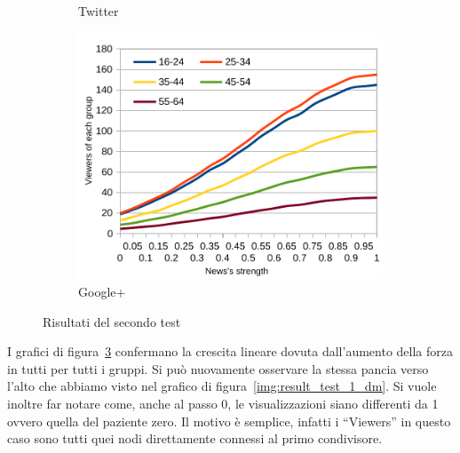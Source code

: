 \begin{figure}[!ht]
\begin{subfigure}[c]{0.32\textwidth}
\begin{center}
    \end{center}
    \vspace*{-10pt}
    \caption{Twitter}
    \label{img:result_test_2_tw_2}
  \end{subfigure}  
  \begin{subfigure}[r]{0.32\textwidth}
    \begin{center}
      \includegraphics[width=1\textwidth]{charts/second-test-gp_2.pdf}
    \end{center}
    \vspace*{-10pt}
    \caption{Google+}
    \label{img:result_test_2_gp_2}
  \end{subfigure}  
 \caption{Risultati del secondo test}
 \label{img:results_test_2_2}
\end{figure}
\vspace*{-15pt}


I grafici di figura~\ref{img:results_test_2_2} confermano la crescita lineare dovuta dall'aumento della forza in tutti per tutti i gruppi.
Si può nuovamente osservare la stessa pancia verso l'alto che abbiamo visto nel grafico di figura~\ref{img:result_test_1_dm}. 
Si vuole inoltre far notare come, anche al passo 0, le visualizzazioni siano differenti da 1 ovvero quella del paziente zero.
Il motivo è semplice, infatti i ``Viewers'' in questo caso sono tutti quei nodi direttamente connessi al primo condivisore.

